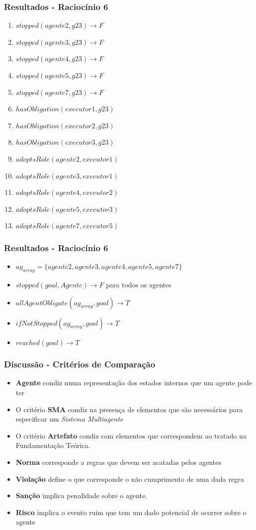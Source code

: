 \documentclass{beamer}
\begin{document}
\begin{frame}
	\frametitle{Resultados - Raciocínio 6}
	\begin{enumerate}
		\item $stopped(agente2,g23) \to F$	
		\item $stopped(agente3,g23) \to F$
		\item $stopped(agente4,g23) \to F$
		\item $stopped(agente5,g23) \to F$
		\item $stopped(agente7,g23) \to F$
		\item $hasObligation(executor1,g23)$	
		\item $hasObligation(executor2,g23)$	
		\item $hasObligation(executor3,g23)$		
		\item $adoptsRole(agente2,executor1)$
		\item $adoptsRole(agente3,executor1)$
		\item $adoptsRole(agente4,executor2)$
		\item $adoptsRole(agente5,executor3)$
		\item $adoptsRole(agente7,executor5)$
	\end{enumerate}
\end{frame}
\begin{frame}
	\frametitle{Resultados - Raciocínio 6}
	\begin{itemize}
		\item $ag_{array} = \{ agente2,agente3,agente4,agente5,agente7 \}$
		\item $stopped(goal,Agente) \to F$ para todos os agentes		
		\item $allAgentObligate(ag_{array},goal) \to T$
		\item $ifNotStopped(ag_{array},goal) \to T$
		\item $reached(goal) \to T$
	\end{itemize}
\end{frame}
\begin{frame}
	\frametitle{Discussão - Critérios de Comparação}
	\begin{itemize}
		\item \textbf{Agente} condiz numa representação dos estados internos que um agente pode ter
		\item O critério \textbf{SMA} condiz na presença de elementos que são necessários para especificar um \textit{Sistema Multiagente}
		\item O critério \textbf{Artefato} condiz com elementos que correspondem ao tratado na Fundamentação Teórica.
		\item \textbf{Norma} corresponde a regras que devem ser acatadas pelos agentes 
		\item \textbf{Violação} define o que corresponde o não cumprimento de uma dada regra
		\item \textbf{Sanção} implica penalidade sobre o agente.
		\item \textbf{Risco} implica o evento ruim que tem um dado potencial de ocorrer sobre o agente
	\end{itemize}
\end{frame}
\end{document}
